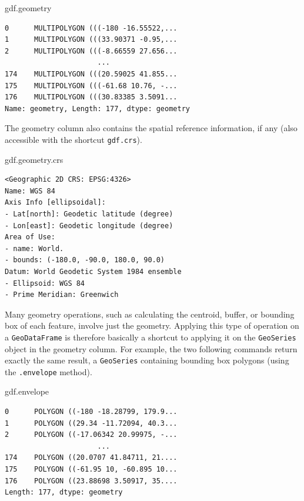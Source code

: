 \documentclass[
  letterpaper,
]{krantz}
\newenvironment{Shaded}{\begin{snugshade}}{\end{snugshade}}
\newcommand{\NormalTok}[1]{\textcolor[rgb]{0.00,0.23,0.31}{#1}}
\begin{document}
\begin{Shaded}
\begin{Highlighting}[]
\NormalTok{gdf.geometry}
\end{Highlighting}
\end{Shaded}

\begin{verbatim}
0      MULTIPOLYGON (((-180 -16.55522,...
1      MULTIPOLYGON (((33.90371 -0.95,...
2      MULTIPOLYGON (((-8.66559 27.656...
                      ...                
174    MULTIPOLYGON (((20.59025 41.855...
175    MULTIPOLYGON (((-61.68 10.76, -...
176    MULTIPOLYGON (((30.83385 3.5091...
Name: geometry, Length: 177, dtype: geometry
\end{verbatim}

The geometry column also contains the spatial reference information, if
any (also accessible with the shortcut \texttt{gdf.crs}).

\begin{Shaded}
\begin{Highlighting}[]
\NormalTok{gdf.geometry.crs}
\end{Highlighting}
\end{Shaded}

\begin{verbatim}
<Geographic 2D CRS: EPSG:4326>
Name: WGS 84
Axis Info [ellipsoidal]:
- Lat[north]: Geodetic latitude (degree)
- Lon[east]: Geodetic longitude (degree)
Area of Use:
- name: World.
- bounds: (-180.0, -90.0, 180.0, 90.0)
Datum: World Geodetic System 1984 ensemble
- Ellipsoid: WGS 84
- Prime Meridian: Greenwich
\end{verbatim}

Many geometry operations, such as calculating the centroid, buffer, or
bounding box of each feature, involve just the geometry. Applying this
type of operation on a \texttt{GeoDataFrame} is therefore basically a
shortcut to applying it on the \texttt{GeoSeries} object in the geometry
column. For example, the two following commands return exactly the same
result, a \texttt{GeoSeries} containing bounding box polygons (using the
\texttt{.envelope} method).

\begin{Shaded}
\begin{Highlighting}[]
\NormalTok{gdf.envelope}
\end{Highlighting}
\end{Shaded}

\begin{verbatim}
0      POLYGON ((-180 -18.28799, 179.9...
1      POLYGON ((29.34 -11.72094, 40.3...
2      POLYGON ((-17.06342 20.99975, -...
                      ...                
174    POLYGON ((20.0707 41.84711, 21....
175    POLYGON ((-61.95 10, -60.895 10...
176    POLYGON ((23.88698 3.50917, 35....
Length: 177, dtype: geometry
\end{verbatim}
\end{document}
